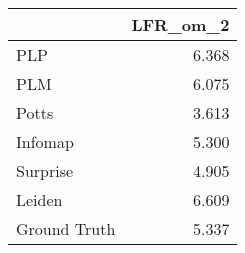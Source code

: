 \begin{tabular}{lr}
\toprule
{} & LFR_om_2 \\
\midrule
PLP          &    6.368 \\
PLM          &    6.075 \\
Potts        &    3.613 \\
Infomap      &    5.300 \\
Surprise     &    4.905 \\
Leiden       &    6.609 \\
Ground Truth &    5.337 \\
\bottomrule
\end{tabular}
